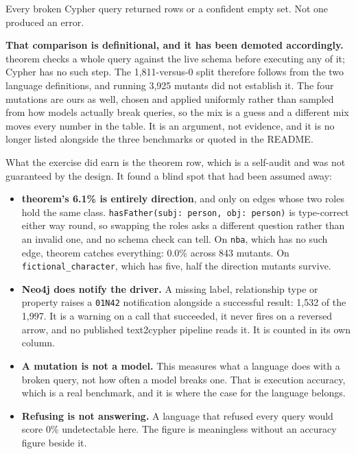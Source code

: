 \documentclass[11pt]{article}
\begin{document}
Every broken Cypher query returned rows or a confident empty set. Not one
produced an error.

\textbf{That comparison is definitional, and it has been demoted accordingly.}
theorem checks a whole query against the live schema before executing any of it;
Cypher has no such step. The 1{,}811-versus-0 split therefore follows from the
two language definitions, and running 3{,}925 mutants did not establish it. The
four mutations are ours as well, chosen and applied uniformly rather than sampled
from how models actually break queries, so the mix is a guess and a different mix
moves every number in the table. It is an argument, not evidence, and it is no
longer listed alongside the three benchmarks or quoted in the README.

What the exercise did earn is the theorem row, which is a self-audit and was not
guaranteed by the design. It found a blind spot that had been assumed away:

\begin{itemize}
  \item \textbf{theorem's 6.1\% is entirely direction}, and only on edges whose
    two roles hold the same class. \texttt{hasFather(subj: person, obj: person)}
    is type-correct either way round, so swapping the roles asks a different
    question rather than an invalid one, and no schema check can tell. On
    \texttt{nba}, which has no such edge, theorem catches everything: 0.0\%
    across 843 mutants. On \texttt{fictional\_character}, which has five, half
    the direction mutants survive.
  \item \textbf{Neo4j does notify the driver.} A missing label, relationship type
    or property raises a \texttt{01N42} notification alongside a successful
    result: 1{,}532 of the 1{,}997. It is a warning on a call that succeeded, it
    never fires on a reversed arrow, and no published text2cypher pipeline reads
    it. It is counted in its own column.
  \item \textbf{A mutation is not a model.} This measures what a language does
    with a broken query, not how often a model breaks one. That is execution
    accuracy, which is a real benchmark, and it is where the case for the
    language belongs.
  \item \textbf{Refusing is not answering.} A language that refused every query
    would score 0\% undetectable here. The figure is meaningless without an
    accuracy figure beside it.
\end{itemize}
\end{document}
